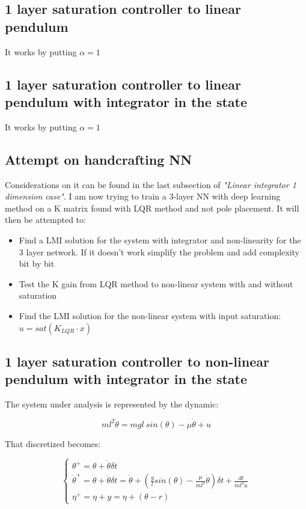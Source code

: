 \documentclass{article}
\begin{document}
\subsection*{1 layer saturation controller to linear pendulum}

It works by putting $\alpha = 1$

\subsection*{1 layer saturation controller to linear pendulum with integrator in the state}

It works by putting $\alpha = 1$

\subsection*{Attempt on handcrafting NN}
Considerations on it can be found in the last subsection of \textit{"Linear integrator 1 dimension case"}.
I am now trying to train a 3-layer NN with deep learning method on a K matrix found with LQR method and not pole placement. It will then be attempted to:
\begin{itemize}
  \item Find a LMI solution for the system with integrator and non-linearity for the 3 layer network. If it doesn't work simplify the problem and add complexity bit by bit
  \item Test the K gain from LQR method to non-linear system with and without saturation
  \item Find the LMI solution for the non-linear system with input saturation: $u = sat(K_{LQR} \cdot x)$
\end{itemize}

\subsection*{1 layer saturation controller to non-linear pendulum with integrator in the state}
The system under analysis is represented by the dynamic:

$$
m l^{2} \ddot{\theta} = m g l\ sin(\theta) - \mu \dot{\theta} + u
$$

That discretized becomes:

$$
  \begin{cases}
    \theta^{+} = \theta + \dot{\theta} \delta t\\
    \dot{\theta}^{+} = \dot{\theta} + \ddot{\theta} \delta t = \dot{\theta} + (\frac{g}{l} sin(\theta) - \frac{\mu}{m l^{2}} \dot{\theta}) \delta t + \frac{dt}{m l^{2} u} \\
    \eta^{+} = \eta + y = \eta + (\theta - r)
  \end{cases}
$$
\end{document}
